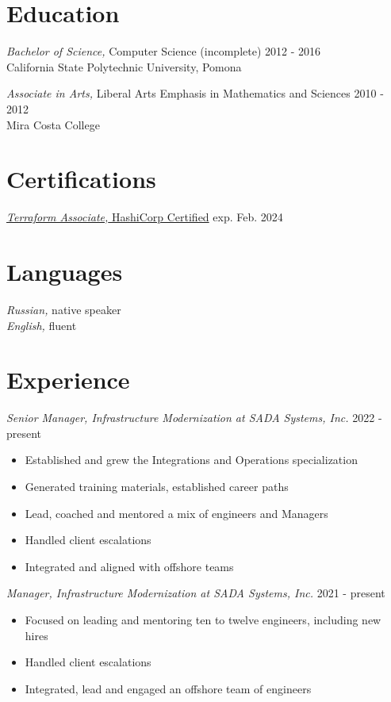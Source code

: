\documentclass[line]{docs/resume/res}
\begin{document}
\address{https://slava.lol}
\address{Email: me@slava.lol}

\begin{resume}

\section{Education}
  {\sl Bachelor of Science,} Computer Science (incomplete) \hfill 2012 - 2016 \\
  California State Polytechnic University, Pomona

  {\sl Associate in Arts,} Liberal Arts Emphasis in Mathematics and Sciences \hfill 2010 - 2012 \\
  Mira Costa College

\section{Certifications}
  \href{https://www.credly.com/earner/earned/badge/7b236fee-2866-4ca1-9da4-7600f851212c}{{\sl Terraform Associate,} HashiCorp Certified} \hfill exp. Feb. 2024

\section{Languages}
  {\sl Russian,} native speaker \\
  {\sl English,} fluent

\section{Experience}
  {\sl Senior Manager, Infrastructure Modernization at SADA Systems, Inc.} \hfill 2022 - present
  \begin{itemize} \itemsep -2pt
    \item Established and grew the Integrations and Operations specialization
    \item Generated training materials, established career paths
    \item Lead, coached and mentored a mix of engineers and Managers
    \item Handled client escalations
    \item Integrated and aligned with offshore teams
  \end{itemize}

  {\sl Manager, Infrastructure Modernization at SADA Systems, Inc.} \hfill 2021 - present
  \begin{itemize} \itemsep -2pt
    \item Focused on leading and mentoring ten to twelve engineers, including new hires
    \item Handled client escalations
    \item Integrated, lead and engaged an offshore team of engineers
  \end{itemize}


\end{resume}
\end{document}
